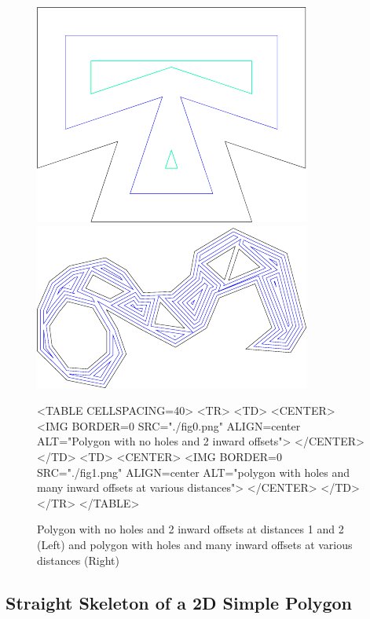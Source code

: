 \begin{figure}[htbp]
\begin{ccTexOnly}
\begin{center}
\includegraphics{Straight_skeleton_2/fig0} %
\includegraphics{Straight_skeleton_2/fig1} %
\end{center}
\end{ccTexOnly}
\caption{Polygon with no holes and 2 inward offsets at distances 1 and 2 (Left) and polygon with holes and many inward offsets at various distances (Right)
\label{Simplepoly-offsets}}
\begin{ccHtmlOnly}
<TABLE CELLSPACING=40>
<TR>
<TD>
<CENTER>
<IMG BORDER=0 SRC="./fig0.png" ALIGN=center ALT="Polygon with no holes and 2 inward offsets">
</CENTER>
</TD>
<TD>
<CENTER>
<IMG BORDER=0 SRC="./fig1.png" ALIGN=center ALT="polygon with holes and many inward offsets at various distances">
</CENTER>
</TD>
</TR>
</TABLE>
\end{ccHtmlOnly}
\end{figure}

\subsection{Straight Skeleton of a 2D Simple Polygon}
 

